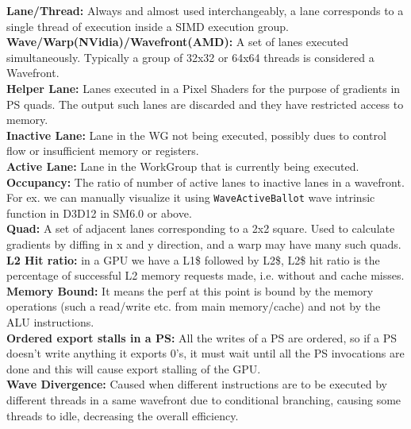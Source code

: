 \documentclass[14pt]{article}
\begin{document}
\textbf{Lane/Thread:} Always and almost used interchangeably, a lane corresponds to a single thread of execution inside a SIMD execution group.\cite{wave} \\ 

\textbf{Wave/Warp(NVidia)/Wavefront(AMD):} A set of lanes executed simultaneously. Typically a group of 32x32 or 64x64 threads is considered a Wavefront.\cite{wave} \\

\textbf{Helper Lane:} Lanes executed in a Pixel Shaders for the purpose of gradients in PS quads. The output such lanes are discarded and they have restricted access to memory.\cite{wave} \\

\textbf{Inactive Lane:} Lane in the WG not being executed, possibly dues to control flow or insufficient memory or registers.\cite{wave} \\

\textbf{Active Lane:} Lane in the WorkGroup that is currently being executed.\cite{wave} \\

\textbf{Occupancy:} The ratio of number of active lanes to inactive lanes in a wavefront. For ex. we can manually visualize it using \lstinline|WaveActiveBallot| wave intrinsic function in D3D12 in SM6.0 or above. \\

\textbf{Quad:} A set of adjacent lanes corresponding to a 2x2 square. Used to calculate gradients by diffing in x and y direction, and a warp may have many such quads. \\

\textbf{L2 Hit ratio:} in a GPU we have a L1\$ followed by L2\$, \cite{l2} L2\$ hit ratio is the percentage of successful L2 memory requests made, i.e. without and cache misses. \\

\textbf{Memory Bound:} It means the perf at this point is bound by the memory operations (such a read/write etc. from main memory/cache) and not by the ALU instructions. \\

\textbf{Ordered export stalls in a PS:} All the writes of a PS are ordered, so if a PS doesn't write anything it exports 0's, it must wait until all the PS invocations are done and this will cause export stalling of the GPU. \\

\textbf{Wave Divergence:} Caused when different instructions are to be executed by different threads in a same wavefront due to conditional branching, causing some threads to idle, decreasing the overall efficiency.
\end{document}
